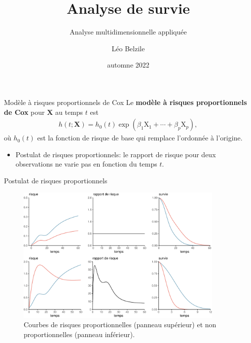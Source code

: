 \documentclass[
  ignorenonframetext,
]{beamer}
\title{Analyse de survie}
\subtitle{Analyse multidimensionnelle appliquée}
\author{Léo Belzile}
\date{automne 2022}
\institute{HEC Montréal}
\providecommand{\tightlist}{%
  \setlength{\itemsep}{0pt}\setlength{\parskip}{0pt}}\usepackage{longtable,booktabs,array}
\begin{document}
\frame{\titlepage}
\ifdefined\Shaded\renewenvironment{Shaded}{\begin{tcolorbox}[frame hidden, interior hidden, breakable, sharp corners, boxrule=0pt, borderline west={3pt}{0pt}{shadecolor}, enhanced]}{\end{tcolorbox}}\fi

\begin{frame}{Modèle à risques proportionnels de Cox}
\protect\hypertarget{moduxe8le-uxe0-risques-proportionnels-de-cox}{}
Le \textbf{modèle à risques proportionnels de Cox} pour \(\mathbf{X}\)
au temps \(t\) est \begin{align*}
h(t; \mathbf{X}) = h_0(t)\exp(\beta_1\mathrm{X}_1 + \cdots + \beta_p \mathrm{X}_p),
\end{align*} où \(h_0(t)\) est la fonction de risque de base qui
remplace l'ordonnée à l'origine.

\begin{itemize}
\tightlist
\item
  Postulat de risques proportionnels: le rapport de risque pour deux
  observations ne varie pas en fonction du temps \(t\).
\end{itemize}
\end{frame}

\begin{frame}{Postulat de risques proportionnels}
\protect\hypertarget{postulat-de-risques-proportionnels}{}
\begin{figure}

{\centering \includegraphics[width=0.9\textwidth,height=\textheight]{MATH60602-diapos10_files/figure-beamer/fig-risquepropfig-1.pdf}

}

\caption{\label{fig-risquepropfig}Courbes de risques proportionnelles
(panneau supérieur) et non proportionnelles (panneau inférieur).}

\end{figure}
\end{frame}
\end{document}

